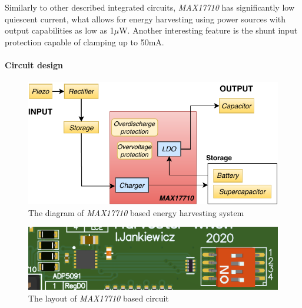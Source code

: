 \documentclass[12pt,a4paper]{article}
\begin{document}
Similarly to other described integrated circuits, \textit{MAX17710} has significantly low quiescent current, what allows for energy harvesting using power sources with output capabilities as low as 1$\mu$W. Another interesting feature is the shunt input protection capable of clamping up to 50mA.
\par

\paragraph{Circuit design}

\begin{figure}[ht!]
\includegraphics[scale=1.2]{MAX17710.pdf}
\caption{The diagram of \textit{MAX17710} based energy harvesting system}
\label{fig:max17710diagram}
\end{figure}

\par

\begin{figure}[ht!]
\includegraphics[scale=1.0]{max17710_layout.png}
\caption{The layout of \textit{MAX17710} based circuit}
\label{fig:max17710layout}
\end{figure}

\par
\end{document}
